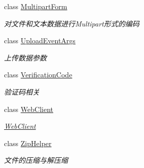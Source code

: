 \begin{DoxyCompactItemize}
class \hyperlink{class_x_c_l_net_tools_1_1_file_handler_1_1_multipart_form}{Multipart\+Form}
\begin{DoxyCompactList}\small\item\em 对文件和文本数据进行\+Multipart形式的编码 \end{DoxyCompactList}\item 
class \hyperlink{class_x_c_l_net_tools_1_1_file_handler_1_1_upload_event_args}{Upload\+Event\+Args}
\begin{DoxyCompactList}\small\item\em 上传数据参数 \end{DoxyCompactList}\item 
class \hyperlink{class_x_c_l_net_tools_1_1_file_handler_1_1_verification_code}{Verification\+Code}
\begin{DoxyCompactList}\small\item\em 验证码相关 \end{DoxyCompactList}\item 
class \hyperlink{class_x_c_l_net_tools_1_1_file_handler_1_1_web_client}{Web\+Client}
\begin{DoxyCompactList}\small\item\em \hyperlink{class_x_c_l_net_tools_1_1_file_handler_1_1_web_client}{Web\+Client} \end{DoxyCompactList}\item 
class \hyperlink{class_x_c_l_net_tools_1_1_file_handler_1_1_zip_helper}{Zip\+Helper}
\begin{DoxyCompactList}\small\item\em 文件的压缩与解压缩 \end{DoxyCompactList}\end{DoxyCompactItemize}

